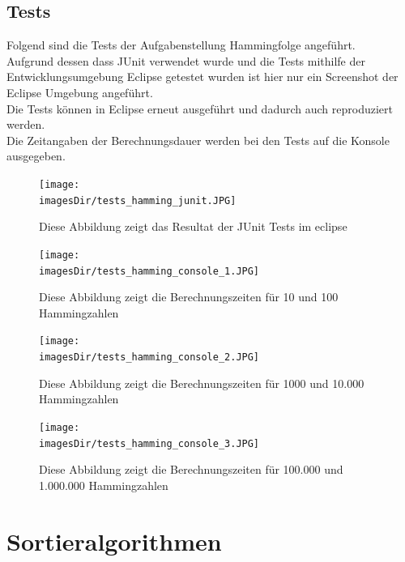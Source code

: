 \documentclass[11pt, a4paper, twoside]{article}   	%
\newcommand{\imagesDir}{images}
\newcommand{\testSection}{Tests}
\begin{document}
\subsection{\testSection}
Folgend sind die Tests der Aufgabenstellung Hammingfolge angeführt.\\
Aufgrund dessen dass JUnit verwendet wurde und die Tests mithilfe der Entwicklungsumgebung Eclipse getestet wurden ist hier nur ein Screenshot der Eclipse Umgebung angeführt.\\
Die Tests können in Eclipse erneut ausgeführt und dadurch auch reproduziert werden.\\ 
Die Zeitangaben der Berechnungsdauer werden bei den Tests auf die Konsole ausgegeben.
\begin{figure}[h]
  \centering
  \texttt{[image: \\imagesDir/tests\_hamming\_junit.JPG]}
  \caption[JUnit Reulstat]
   {Diese Abbildung zeigt das Resultat der JUnit Tests im eclipse}
\end{figure}
\begin{figure}[h]
  \centering
  \texttt{[image: \\imagesDir/tests\_hamming\_console\_1.JPG]}
  \caption[Konsolenausgabe der Berechnungszeiten]
   {Diese Abbildung zeigt die Berechnungszeiten für 10 und 100 Hammingzahlen}
\end{figure}
\newpage
\begin{figure}[h]
  \centering
  \texttt{[image: \\imagesDir/tests\_hamming\_console\_2.JPG]}
  \caption[Konsolenausgabe der Berechnungszeiten]
   {Diese Abbildung zeigt die Berechnungszeiten für 1000 und 10.000 Hammingzahlen}
\end{figure}
\newpage
\begin{figure}[h]
  \centering
 \texttt{[image: \\imagesDir/tests\_hamming\_console\_3.JPG]}
  \caption[Konsolenausgabe der Berechnungszeiten]
   {Diese Abbildung zeigt die Berechnungszeiten für 100.000 und 1.000.000 Hammingzahlen}
\end{figure}
\newpage
{\color{myred}
	\section
		{Sortieralgorithmen}
}
\end{document}
